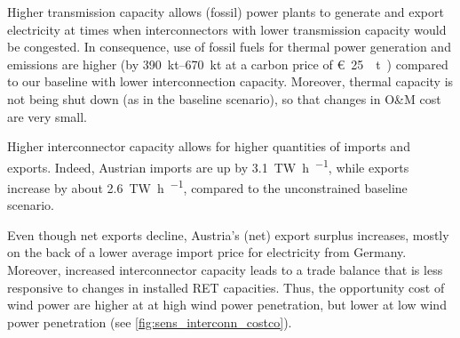 \documentclass[review, 3p, times, 12pt, authoryear]{elsarticle}
\begin{document}
    Higher transmission capacity allows (fossil) power plants to generate and export electricity at times when interconnectors with lower transmission capacity would be congested.
    In consequence, use of fossil fuels for thermal power generation and  emissions are higher (by \SIrange{390}{670}{\kilo\tonne} at a carbon price of \SI[per-mode=symbol,sticky-per, bracket-unit-denominator=false]{25}[\euro]{\per\tonne\coo}) compared to our baseline with lower interconnection capacity.
    Moreover, thermal capacity is not being shut down (as in the baseline scenario), so that changes in O\&M cost are very small.

    Higher interconnector capacity allows for higher quantities of imports and exports.
    Indeed, Austrian imports are up by \SI[per-mode=symbol,sticky-per, bracket-unit-denominator=false]{3.1}{\tera\watt\hour\per\year}, while exports increase by about \SI[per-mode=symbol,sticky-per, bracket-unit-denominator=false]{2.6}{\tera\watt\hour\per\year}, compared to the unconstrained baseline scenario.

    Even though net exports decline, Austria's (net) export surplus increases, mostly on the back of a lower average import price for electricity from Germany.
    Moreover, increased interconnector capacity leads to a trade balance that is less responsive to changes in installed RET capacities.
    Thus, the opportunity cost of wind power are higher at at high wind power penetration, but lower at low wind power penetration (see \autoref{fig:sens_interconn_costco}).
\end{document}
